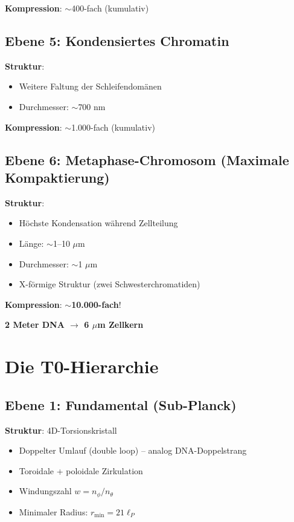 	\textbf{Kompression}: $\sim$400-fach (kumulativ)
	
	\subsection{Ebene 5: Kondensiertes Chromatin}
	
	\textbf{Struktur}:
	\begin{itemize}
		\item Weitere Faltung der Schleifendomänen
		\item Durchmesser: $\sim$700 nm
	\end{itemize}
	
	\textbf{Kompression}: $\sim$1.000-fach (kumulativ)
	
	\subsection{Ebene 6: Metaphase-Chromosom (Maximale Kompaktierung)}
	
	\textbf{Struktur}:
	\begin{itemize}
		\item Höchste Kondensation während Zellteilung
		\item Länge: $\sim$1--10 $\mu$m
		\item Durchmesser: $\sim$1 $\mu$m
		\item X-förmige Struktur (zwei Schwesterchromatiden)
	\end{itemize}
	
	\textbf{Kompression}: $\sim$\textbf{10.000-fach}!
	
	\begin{center}
		\textbf{2 Meter DNA $\to$ 6 $\mu$m Zellkern}
	\end{center}
	
	\section{Die T0-Hierarchie}
	
	\subsection{Ebene 1: Fundamental (Sub-Planck)}
	
	\textbf{Struktur}: 4D-Torsionskristall
	\begin{itemize}
		\item Doppelter Umlauf (double loop) -- analog DNA-Doppelstrang
		\item Toroidale + poloidale Zirkulation
		\item Windungszahl $w = n_\phi / n_\theta$
		\item Minimaler Radius: $r_{\min} = 21\ell_P$
	\end{itemize}
	
